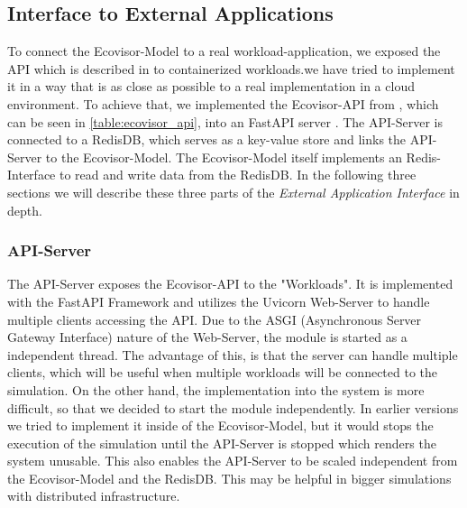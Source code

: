 \subsection{Interface to External Applications}


To connect the Ecovisor-Model to a real workload-application, we exposed the API which is described in \cite{souza2023} to containerized workloads.we have tried to implement it in a way that is as close as possible to a real implementation in a cloud environment.
To achieve that, we implemented the Ecovisor-API from \cite{souza2023}, which can be seen in \ref{table:ecovisor_api}, into an FastAPI server \cite{fastapi}.
The API-Server is connected to a RedisDB\cite{redis}, which serves as a key-value store and links the API-Server to the Ecovisor-Model.
The Ecovisor-Model itself implements an Redis-Interface to read and write data from the RedisDB.
In the following three sections we will describe these three parts of the \textit{External Application Interface} in depth.

\subsubsection{API-Server}
The API-Server exposes the Ecovisor-API to the "Workloads". It is implemented with the FastAPI Framework and utilizes the Uvicorn Web-Server \cite{uvicorn} to handle multiple clients accessing the API. Due to the ASGI (Asynchronous Server Gateway Interface) nature of the Web-Server, the module is started as a independent thread. The advantage of this, is that the server can handle multiple clients, which will be useful when multiple workloads will be connected to the simulation. On the other hand, the implementation into the system is more difficult, so that we decided to start the module independently. In earlier versions we tried to implement it inside of the Ecovisor-Model, but it would stops the execution of the simulation until the API-Server is stopped which renders the system unusable. This also enables the API-Server to be scaled independent from the Ecovisor-Model and the RedisDB. This may be helpful in bigger simulations with distributed infrastructure.

